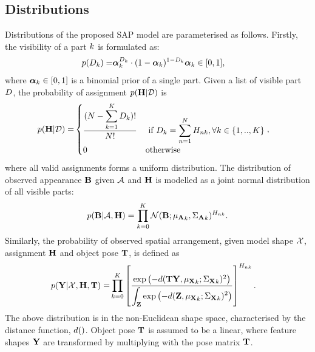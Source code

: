 \subsection{Distributions}

Distributions of the proposed SAP model are parameterised as follows. Firstly, the visibility of a part $k$ is formulated as:
\begin{align}
	p({D}_{k}) = & \bm{\alpha}_k^{{D}_{k}}\cdot(1-\bm{\alpha}_k)^{1-{D}_{k}} \bm{\alpha}_k\in[0, 1], 
	\label{eqn/reg/Ddist}
\end{align}
where $\bm{\alpha}_k\in [0, 1]$ is a binomial prior of a single part. Given a list of visible part ${D}$, the probability of assignment $p(\mathbf{H}|\mathcal{D})$ is 
\begin{align}
	p(\mathbf{H}|\mathcal{D}) = & 
	\begin{cases} 
		\displaystyle\frac{(N - \displaystyle\sum_{k=1}^{K}{D}_k)!}{N!} & \mbox{ if } {D}_k = \displaystyle\sum_{n=1}^{N}{H}_{nk},   \forall k\in\{1,..,K\} \\[3mm]
	0 & \mbox{otherwise} 
	\end{cases},
	\label{eqn/reg/HDdist}
\end{align}
where all valid assignments forms a uniform distribution. The distribution of observed appearance $\mathbf{B}$ given $\mathcal{A}$ and $\mathbf{H}$ is modelled as a joint normal distribution of all visible parts:  
\begin{equation}
	p(\mathbf{B}|\mathcal{A},\mathbf{H}) = \displaystyle\prod_{k=0}^K
	\mathcal{N}(\mathbf{B}; {\mu_{\mathbf{A}}}_k, {\Sigma_{\mathbf{A}}}_k)^{{H}_{nk}}.
	\label{eqn/reg/appearance}
\end{equation}
Similarly, the probability of observed spatial arrangement, given model shape $\mathcal{X}$, assignment $\mathbf{H}$ and object pose $\mathbf{T}$, is defined as 
\begin{align}
	\displaystyle p(\mathbf{Y}|\mathcal{X},\mathbf{H},\mathbf{T}) = & \prod_{k=0}^K
	\left[\frac{\textstyle\exp\left(-d(\mathbf{T}\mathbf{Y}, {\mu_{\mathbf{X}}}_k; {\Sigma_{\mathbf{X}}}_k)^2\right)}{\displaystyle\int_{\mathbf{Z}} \exp\left(-d(\mathbf{Z}, {\mu_{\mathbf{X}}}_k; {\Sigma_{\mathbf{X}}}_k)^2\right)}\right]^{{H}_{nk}}.
	\label{eqn/reg/shape}
\end{align}
The above distribution is in the non-Euclidean shape space, characterised by the distance function, $d()$. Object pose $\mathbf{T}$ is assumed to be a linear, where feature shapes $\mathbf{Y}$ are transformed by multiplying with the pose matrix $\mathbf{T}$.   

